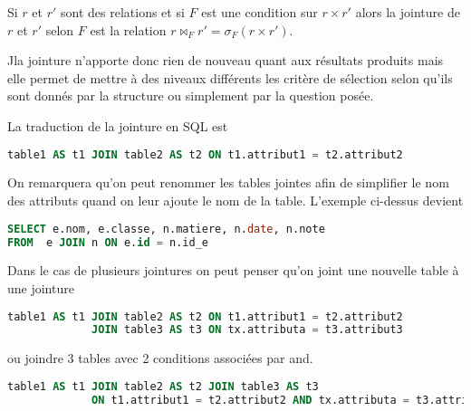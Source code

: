 \begin{defin}[Jointure]

Si $r$ et $r'$ sont des relations et si $F$ est une condition sur $r\times r'$ 
alors la jointure de $r$ et $r'$ selon $F$ est la relation $r\bowtie_F r'=\sigma_F(r\times r')$.
\end{defin}

Jla jointure n'apporte donc rien de nouveau quant aux résultats produits mais elle permet de mettre à des niveaux différents les critère de sélection selon qu'ils sont donnés par la structure ou simplement par la question posée.

La traduction de la jointure en SQL est
\begin{lstlisting}[language=SQL]
table1 AS t1 JOIN table2 AS t2 ON t1.attribut1 = t2.attribut2
\end{lstlisting}

On remarquera qu'on peut renommer les tables jointes afin de simplifier le nom des attributs quand on leur ajoute le nom de la table. L'exemple ci-dessus devient 
\begin{lstlisting}[language=SQL]
SELECT e.nom, e.classe, n.matiere, n.date, n.note
FROM  e JOIN n ON e.id = n.id_e
\end{lstlisting}

Dans le cas de plusieurs jointures on peut penser qu'on joint une nouvelle table à une jointure
\begin{lstlisting}[language=SQL]
table1 AS t1 JOIN table2 AS t2 ON t1.attribut1 = t2.attribut2
             JOIN table3 AS t3 ON tx.attributa = t3.attribut3
\end{lstlisting}
ou joindre 3 tables avec 2 conditions associées par {\sc and}.
\begin{lstlisting}[language=SQL]
table1 AS t1 JOIN table2 AS t2 JOIN table3 AS t3 
             ON t1.attribut1 = t2.attribut2 AND tx.attributa = t3.attribut3
\end{lstlisting}
\newpage
